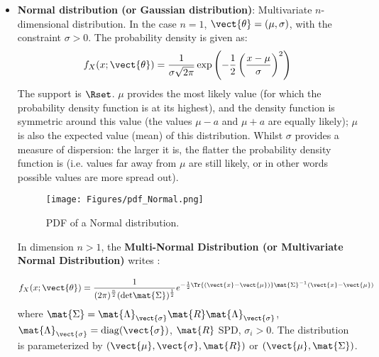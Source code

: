 {\begin{itemize}
\item {\bf Normal distribution (or Gaussian distribution)}: Multivariate $n$-dimensional distribution. In the case $n=1$, $\vect{\theta} = \left(\mu,\sigma \right)$, with the constraint  $\sigma>0$. The probability density is given as:
\begin{equation}
f_X(x;\vect{\theta}) = \frac{1}{\sigma \sqrt{2\pi}} \exp \left( -\frac{1}{2} \left( \frac{x-\mu}{\sigma} \right)^2 \right)
\end{equation}
The support is $\Rset$. $\mu$ provides the most likely value (for
which the probability density function is at its highest), and the
density function is symmetric around this value (the values
$\mu-a$ and $\mu+a$ are equally likely); $\mu$ is also the
expected value (mean) of this distribution. Whilst $\sigma$
provides a measure of dispersion: the larger it is, the flatter the probability density function is (i.e. values far away from $\mu$ are still likely, or in other words possible values are more spread out).

\begin{figure}[H]
\begin{center}
\texttt{[image: Figures/pdf\_Normal.png]}
\caption{PDF of a Normal distribution.}
\end{center}
\end{figure}

In dimension $n>1$, the {\bf Multi-Normal Distribution (or Multivariate Normal Distribution)} writes :
\begin{equation}
f_X(x;\vect{\theta}) = \displaystyle
\frac{1}
{
\displaystyle (2\pi)^{\frac{n}{2}}(\mathrm{det}\mat{\Sigma})^{\frac{1}{2}}
}
\displaystyle e^{-\frac{1}{2}\Tr{(\vect{x}-\vect{\mu})}\mat{\Sigma}^{-1^{\strut}}(\vect{x}-\vect{\mu})}
\end{equation}
where  $\mat{\Sigma} = \mat{\Lambda}_{\vect{\sigma}} \mat{R} \mat{\Lambda}_{\vect{\sigma}}$, $\mat{\Lambda}_{\vect{\sigma}} = \mathrm{diag}(\vect{\sigma})$, $\mat{R}$ SPD, $\sigma_i >0$. The distribution is parameterized by  $(\vect{\mu}, \vect{\sigma},\mat{R})$ or $(\vect{\mu}, \mat{\Sigma})$.






\end{itemize}}
